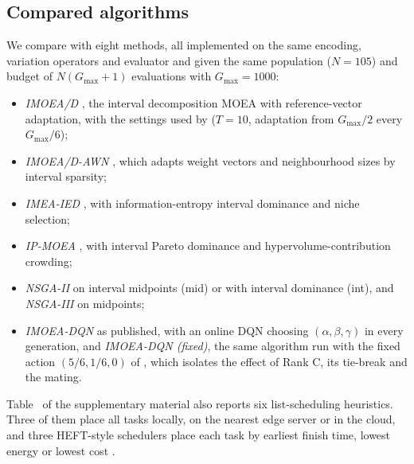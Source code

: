 \subsection{Compared algorithms}
We compare \ours{} with eight methods, all implemented on the same encoding, variation operators and evaluator and given
the same population ($N = 105$) and budget of $N(G_{\max}+1)$ evaluations with $G_{\max} = 1000$:
\begin{itemize}
\item \emph{IMOEA/D} \citep{gan2023imoead}, the interval decomposition MOEA with reference-vector adaptation, with the
  settings used by \citet{cui2024imeaied} ($T = 10$, adaptation from $G_{\max}/2$ every $G_{\max}/6$);
\item \emph{IMOEA/D-AWN} \citep{jin2023imoeadawn}, which adapts weight vectors and neighbourhood sizes by interval sparsity;
\item \emph{IMEA-IED} \citep{cui2024imeaied}, with information-entropy interval dominance and niche selection;
\item \emph{IP-MOEA} \citep{limbourg2005ipmoea}, with interval Pareto dominance and hypervolume-contribution crowding;
\item \emph{NSGA-II} \citep{deb2002nsga2} on interval midpoints (mid) or with interval dominance (int), and
  \emph{NSGA-III} \citep{deb2014nsga3} on midpoints;
\item \emph{IMOEA-DQN} \citep{jin2026imoeadqn} as published, with an online DQN choosing $(\alpha, \beta, \gamma)$ in every
  generation, and \emph{IMOEA-DQN (fixed)}, the same algorithm run with the fixed action $(5/6, 1/6, 0)$ of \ours{},
  which isolates the effect of Rank C, its tie-break and the mating.
\end{itemize}
Table~ of the supplementary material also reports six list-scheduling heuristics. Three of them
place all tasks locally, on the nearest edge server or in the cloud, and three HEFT-style schedulers place each task by
earliest finish time, lowest energy or lowest cost \citep{topcuoglu2002heft}.

